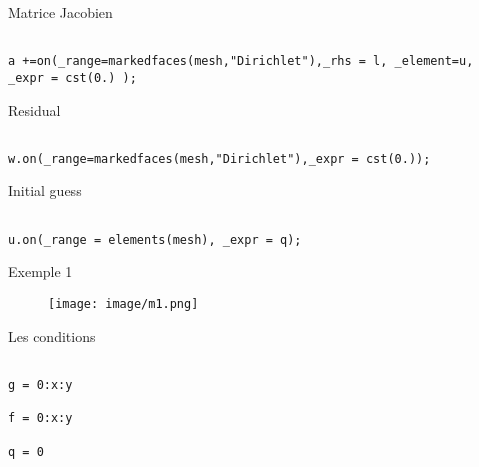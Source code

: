 \documentclass[11pt]{beamer}
\begin{document}


\begin{frame}
\begin{block}{Matrice Jacobien}
\begin{verbatim}

a +=on(_range=markedfaces(mesh,"Dirichlet"),_rhs = l, _element=u, _expr = cst(0.) );

\end{verbatim}
\end{block}


\begin{block}{Residual}
\begin{verbatim}

w.on(_range=markedfaces(mesh,"Dirichlet"),_expr = cst(0.));
\end{verbatim}

\end{block}


\begin{block}{Initial guess}
\begin{verbatim}

u.on(_range = elements(mesh), _expr = q);
\end{verbatim}
\end{block}


\end{frame}



\begin{frame}{Exemple 1}
\begin{figure}
\texttt{[image: image/m1.png]}
\end{figure}

\begin{block}{Les conditions}
\begin{verbatim}

g = 0:x:y

f = 0:x:y

q = 0
\end{verbatim}
\end{block}

\end{frame}



\end{document}
